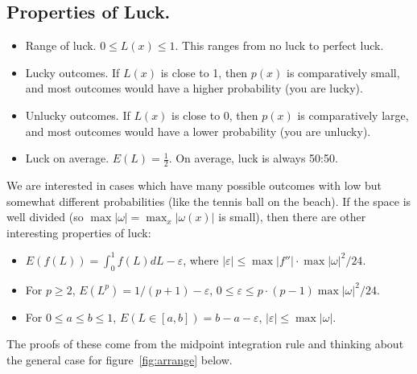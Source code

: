 \subsection{Properties of Luck.}
\begin{itemize}
\item Range of luck. $0 \leq L(x) \leq 1$.  This ranges from no luck to perfect luck.
\item Lucky outcomes. If $L(x)$ is close to 1, then $p(x)$ is comparatively small, and most outcomes would have a higher probability (you are lucky).  
\item Unlucky outcomes. If $L(x)$ is close to 0, then $p(x)$ is comparatively large, and most outcomes would have a lower probability (you are unlucky).
\item Luck on average. $E(L)=\frac{1}{2}$.  On average, luck is always 50:50.
\end{itemize}

We are interested in cases which have many possible outcomes with low but somewhat different probabilities (like the tennis ball on the beach).  If the space is well divided (so $\max |\omega|=\max_{x}|\omega(x)|$ is small), then there are other interesting properties of luck:
\begin{itemize}
\item $E(f(L))=\int_0^1 f(L) dL-\varepsilon$, where $|\varepsilon| \leq \max|f''| \cdot \max |\omega|^2 / 24$.
\item For $p \geq 2$, $E(L^p)=1/(p+1)-\varepsilon$, $0 \leq \varepsilon \leq p \cdot (p-1) \max |\omega|^2/24$.
\item For $0 \leq a \leq b \leq 1$, $E(L \in [a,b])=b-a - \varepsilon$, $|\varepsilon| \leq \max |\omega|$.
\end{itemize}
The proofs of these come from the midpoint integration rule and thinking about the general case for figure~\ref{fig:arrange} below.

